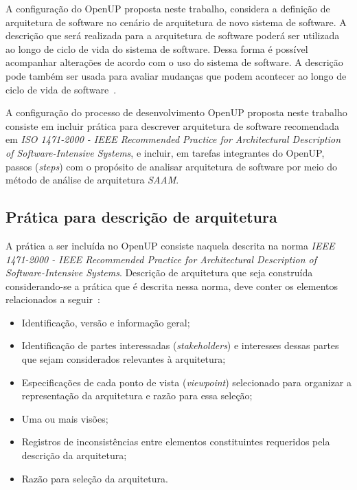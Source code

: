A configuração do OpenUP proposta neste trabalho, considera a definição de arquitetura de software no cenário de arquitetura de novo sistema de software. A descrição que será realizada para a arquitetura de software poderá ser utilizada ao longo de ciclo de vida do sistema de software. Dessa forma é possível acompanhar alterações de acordo com o uso do sistema de software. A descrição pode também ser usada para avaliar mudanças que podem acontecer ao longo de ciclo de vida de software~\cite{ISO_1471}.

A configuração do processo de desenvolvimento OpenUP proposta neste trabalho consiste em incluir prática para descrever arquitetura de software recomendada em \emph{ISO 1471-2000 - IEEE Recommended Practice for Architectural Description of Software-Intensive Systems}, e incluir, em tarefas integrantes do OpenUP, passos (\emph{steps}) com o propósito de analisar arquitetura de software por meio do método de análise de arquitetura \emph{\acrfull{SAAM}}.

\subsection{Prática para descrição de arquitetura}
\label{sec:5.2.1}
A prática a ser incluída no OpenUP consiste naquela descrita na norma \emph{IEEE 1471-2000 - IEEE Recommended Practice for Architectural Description of Software-Intensive Systems}. Descrição de arquitetura que seja construída considerando-se a prática que é descrita nessa norma, deve conter os elementos  relacionados a seguir~\cite{ISO_1471}:

\begin{itemize}
    \item Identificação, versão e informação geral;
    \item Identificação de partes interessadas (\emph{stakeholders}) e interesses dessas partes que sejam considerados relevantes à arquitetura;
    \item Especificações de cada ponto de vista (\emph{viewpoint}) selecionado para organizar a representação da arquitetura e razão para essa seleção;
    \item Uma ou mais visões;
    \item Registros de inconsistências entre elementos constituintes requeridos pela descrição da arquitetura;
    \item Razão para seleção da arquitetura.

\end{itemize}

